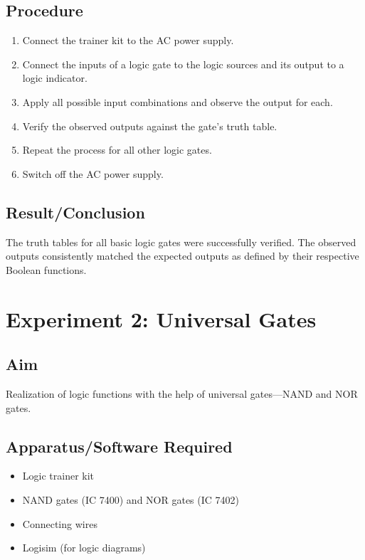 \documentclass[11pt]{article}
\begin{document}
\subsection{Procedure}
\begin{enumerate}
    \item Connect the trainer kit to the AC power supply.
    \item Connect the inputs of a logic gate to the logic sources and its output to a logic indicator.
    \item Apply all possible input combinations and observe the output for each.
    \item Verify the observed outputs against the gate's truth table.
    \item Repeat the process for all other logic gates.
    \item Switch off the AC power supply.
\end{enumerate}

\subsection{Result/Conclusion}
The truth tables for all basic logic gates were successfully verified. The observed outputs consistently matched the expected outputs as defined by their respective Boolean functions.

\newpage
\section{Experiment 2: Universal Gates}

\subsection{Aim}
Realization of logic functions with the help of universal gates—NAND and NOR gates.

\subsection{Apparatus/Software Required}
\begin{itemize}
    \item Logic trainer kit
    \item NAND gates (IC 7400) and NOR gates (IC 7402)
    \item Connecting wires
    \item Logisim (for logic diagrams)
\end{itemize}
\end{document}
